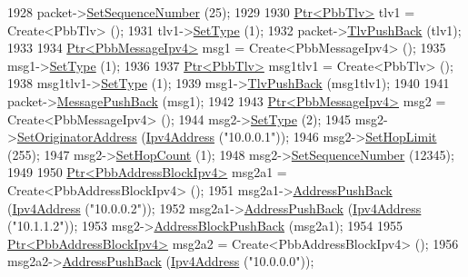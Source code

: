\begin{DoxyCode}
1928     packet->\hyperlink{classns3_1_1PbbPacket_a7d6a1602be86109760d0f26ff9bbbb8e}{SetSequenceNumber} (25);
1929 
1930     \hyperlink{classns3_1_1Ptr}{Ptr<PbbTlv>} tlv1 = Create<PbbTlv> ();
1931     tlv1->\hyperlink{classns3_1_1PbbTlv_a90a0452018ed364ac37c3ad116dd718b}{SetType} (1);
1932     packet->\hyperlink{classns3_1_1PbbPacket_a34935793e729a106c176db99c969cb42}{TlvPushBack} (tlv1);
1933 
1934     \hyperlink{classns3_1_1Ptr}{Ptr<PbbMessageIpv4>} msg1 = Create<PbbMessageIpv4> ();
1935     msg1->\hyperlink{classns3_1_1PbbMessage_a4b3d1eaabd3e7412a46ac79bf3360dac}{SetType} (1);
1936 
1937     \hyperlink{classns3_1_1Ptr}{Ptr<PbbTlv>} msg1tlv1 = Create<PbbTlv> ();
1938     msg1tlv1->\hyperlink{classns3_1_1PbbTlv_a90a0452018ed364ac37c3ad116dd718b}{SetType} (1);
1939     msg1->\hyperlink{classns3_1_1PbbMessage_aac70b2672f79765cf5cc5b6666018165}{TlvPushBack} (msg1tlv1);
1940 
1941     packet->\hyperlink{classns3_1_1PbbPacket_a4a3170001ef758d9c9c4375b8f089826}{MessagePushBack} (msg1);
1942 
1943     \hyperlink{classns3_1_1Ptr}{Ptr<PbbMessageIpv4>} msg2 = Create<PbbMessageIpv4> ();
1944     msg2->\hyperlink{classns3_1_1PbbMessage_a4b3d1eaabd3e7412a46ac79bf3360dac}{SetType} (2);
1945     msg2->\hyperlink{classns3_1_1PbbMessage_a52ac135a2bec53db5e8f46b8b8a25e7c}{SetOriginatorAddress} (\hyperlink{classns3_1_1Ipv4Address}{Ipv4Address} (\textcolor{stringliteral}{"10.0.0.1"}));
1946     msg2->\hyperlink{classns3_1_1PbbMessage_a532a7e5e135f7491f8a84ab1dfadd28f}{SetHopLimit} (255);
1947     msg2->\hyperlink{classns3_1_1PbbMessage_a882ec7e2e9a9dff6297152c196d54ce4}{SetHopCount} (1);
1948     msg2->\hyperlink{classns3_1_1PbbMessage_a8c24696ac67507afa03c9750daccc47d}{SetSequenceNumber} (12345);
1949 
1950     \hyperlink{classns3_1_1Ptr}{Ptr<PbbAddressBlockIpv4>} msg2a1 = Create<PbbAddressBlockIpv4> ();
1951     msg2a1->\hyperlink{classns3_1_1PbbAddressBlock_a7be545a53d69bd426dbebcf752ed8371}{AddressPushBack} (\hyperlink{classns3_1_1Ipv4Address}{Ipv4Address} (\textcolor{stringliteral}{"10.0.0.2"}));
1952     msg2a1->\hyperlink{classns3_1_1PbbAddressBlock_a7be545a53d69bd426dbebcf752ed8371}{AddressPushBack} (\hyperlink{classns3_1_1Ipv4Address}{Ipv4Address} (\textcolor{stringliteral}{"10.1.1.2"}));
1953     msg2->\hyperlink{classns3_1_1PbbMessage_a5f623bad2fb1adde7da885e1c92d5311}{AddressBlockPushBack} (msg2a1);
1954 
1955     \hyperlink{classns3_1_1Ptr}{Ptr<PbbAddressBlockIpv4>} msg2a2 = Create<PbbAddressBlockIpv4> ();
1956     msg2a2->\hyperlink{classns3_1_1PbbAddressBlock_a7be545a53d69bd426dbebcf752ed8371}{AddressPushBack} (\hyperlink{classns3_1_1Ipv4Address}{Ipv4Address} (\textcolor{stringliteral}{"10.0.0.0"}));

\end{DoxyCode}
